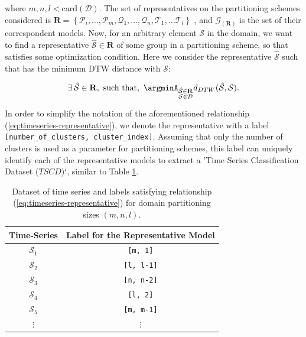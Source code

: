 where $m, n, l < \textrm{card}(\mathcal{D})$. The set of representatives on the partitioning schemes considered is $\mathbf{R} = \left\{\mathcal{P}_{i}, \ldots, \mathcal{P}_{m}, \mathcal{Q}_{1}, \ldots, \mathcal{Q}_{n}, \mathcal{T}_{1}, \ldots \mathcal{T}_{l} \right\}$ , and $\mathcal{G}_{(\mathbf{R})}$ is the set of their correspondent models. Now, for an arbitrary element $\mathcal{S}$ in the domain, we want to find a representative $\mathcal{\hat{S}} \in \mathbf{R}$ of some group in a partitioning scheme, so that satisfies some optimization condition. Here we consider the representative $\mathcal{\hat{S}}$ such that has the minimum DTW distance with $\mathcal{S}$:

\begin{equation}\label{eq:timeseries-representative}
 \exists\, \mathcal{\hat{S}} \in \mathbf{R}, \,\, \textrm{such that}, \,\, \argminA_{\substack{\mathcal{\hat{S}} \in \mathbf{R}\\\mathcal{S} \in \mathcal{D}}} d_{DTW}(\mathcal{\hat{S}}, \mathcal{S}).
\end{equation}

In order to simplify the notation of the aforementioned relationship (\ref{eq:timeseries-representative}), we denote the representative with a label \texttt{[number\_of\_clusters, cluster\_index]}. Assuming that only the number of clusters is used as a parameter for partitioning schemes, this label can uniquely identify each of the representative models to extract a 'Time Series Classification Dataset ($TSCD$)`, similar to Table \ref{Tab:TSClassificationDataset}.

\begin{table}[h]
	\centering
	\begin{tabular}{|c|c|}
		\hline
		Time-Series & Label for the Representative Model\\ \hline
		$\mathcal{S}_{1}$ & \texttt{[m, 1]} \\ \hline
		$\mathcal{S}_{2}$ & \texttt{[l, l-1]} \\ \hline
		$\mathcal{S}_{3}$ & \texttt{[n, n-2]} \\ \hline
		$\mathcal{S}_{4}$ & \texttt{[l, 2]} \\ \hline
		$\mathcal{S}_{5}$ & \texttt{[m, m-1]} \\ \hline
		$\vdots$ & $\vdots$ \\ \hline
	\end{tabular}
	\caption{Dataset of time series and labels satisfying relationship (\ref{eq:timeseries-representative}) for domain partitioning sizes $(m,n,l)$.}
	\label{Tab:TSClassificationDataset}
\end{table}

